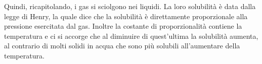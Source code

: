 \vspace{0.2cm}Quindi, ricapitolando, i gas si sciolgono nei liquidi. La loro solubilità è data dalla legge di Henry, la quale dice che la solubilità è direttamente proporzionale alla pressione esercitata dal gas. Inoltre la costante di proporzionalità contiene la temperatura e ci si accorge che al diminuire di quest'ultima la solubilità aumenta, al contrario di molti solidi in acqua che sono più solubili all'aumentare della temperatura.